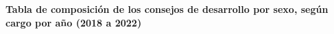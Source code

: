 {\color{color3}\LARGE\textbf{Tabla de composición de los consejos de desarrollo por sexo, según cargo por año (2018 a 2022)}}
\begin{table}[h]
	
\end{table}